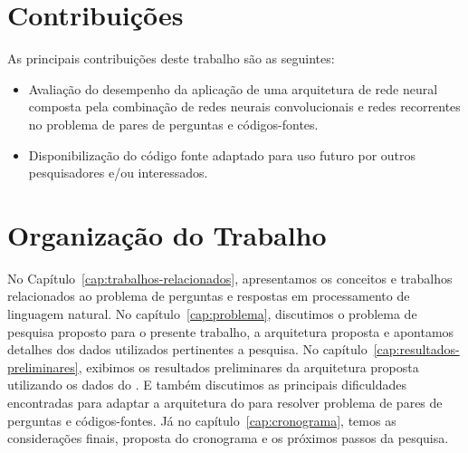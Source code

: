 \section{Contribuições}
\label{sec:contribucoes}

As principais contribuições deste trabalho são as seguintes:

\begin{itemize}
  \item Avaliação do desempenho da aplicação de uma arquitetura de rede neural composta pela combinação de redes neurais convolucionais e redes recorrentes no problema de pares de perguntas e códigos-fontes.
  \item Disponibilização do código fonte adaptado para uso futuro por outros pesquisadores e/ou interessados.
\end{itemize}

\section{Organização do Trabalho}
\label{sec:organizacao_trabalho}

No Capítulo~\ref{cap:trabalhos-relacionados}, apresentamos os conceitos e trabalhos relacionados ao problema de perguntas e respostas em processamento de linguagem natural. No capítulo~\ref{cap:problema}, discutimos o problema de pesquisa proposto para o presente trabalho, a arquitetura proposta e apontamos detalhes dos dados utilizados pertinentes a pesquisa. 
No capítulo~\ref{cap:resultados-preliminares}, exibimos os resultados preliminares da arquitetura proposta utilizando os dados do \cite{yao-2018}. E também discutimos as principais dificuldades encontradas para adaptar a arquitetura do \cite{feng-2015} para resolver problema de pares de perguntas e códigos-fontes. Já no capítulo~\ref{cap:cronograma}, temos as considerações finais, proposta do cronograma e os próximos passos da pesquisa.
